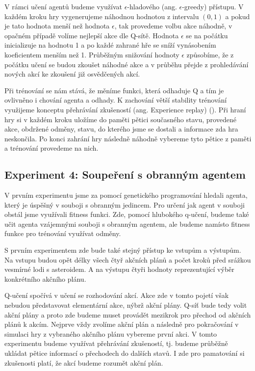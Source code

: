 V rámci učení agentů budeme využívat $\epsilon$-hladového (ang. $\epsilon$-greedy) přístupu.
V každém kroku hry vygenerujeme náhodnou hodnotou z intervalu $(0,1)$ a pokud je tato hodnota menší než hodnota $\epsilon$, tak provedeme volbu akce náhodně, v opačném případě volíme nejlepší akce dle Q-sítě.
Hodnota $\epsilon$ se na počátku inicializuje na hodnotu 1 a po každé zahrané hře se sníží vynásobením koeficientem menším než 1. 
Průběžným snižování hodnoty $\epsilon$ způsobíme, že z počátku učení se budou zkoušet náhodné akce a v průběhu přejde z prohledávání nových akcí ke zkoušení již osvědčených akcí.


\par
Při trénování se nám stává, že měníme funkci, která odhaduje Q a tím je ovlivněno i chování agenta a odhady. K zachování větší stability trénování využijeme konceptu přehrávání zkušeností (ang. Experience replay) (\cite{experienceReplay}).
Při hraní hry si v každém kroku uložíme do paměti pětici současného stavu, provedené akce, obdržené odměny, stavu, do kterého jsme se dostali a informace zda hra neskončila.
Po konci zahrání hry následně náhodně vybereme tyto pětice z paměti a trénování provedeme na nich.


\newpage
\subsection{Experiment 4: Soupeření s obranným agentem}
V prvním experimentu jsme za pomocí genetického programování hledali agenta, který je úspěšný v souboji s obranným jedincem. Pro určení jak agent v souboji obstál jsme využívali fitness funkci.
Zde, pomocí hlubokého q-učení, budeme také učit agenta vzájemnými souboji s obranným agentem, ale budeme namísto fitness funkce pro trénování využívat odměny.

S prvním experimentem zde bude také stejný přístup ke vstupům a výstupům. 
Na vstupu budou opět délky všech čtyř akčních plánů a počet kroků před srážkou vesmírné lodi s asteroidem.
A na výstupu čtyři hodnoty reprezentující výběr konkrétního akčního plánu.

Q-učení spočívá v učení se rozhodování akcí. Akce zde v tomto pojetí však nebudou představovat elementární akce, nýbrž akční plány. 
Q-síť bude tedy volit akční plány a proto zde budeme muset provádět mezikrok pro přechod od akčních plánů k akcím.
Nejprve vždy zvolíme akční plán a následně pro pokračování v simulaci hry z vybraného akčního plánu vybereme první akci.
V tomto experimentu budeme využívat přehrávání zkušeností, tj. budeme průběžně ukládat pětice informací o přechodech do dalších stavů. 
I zde pro pamatování si zkušenosti platí, že akcí budeme rozumět akční plán.


